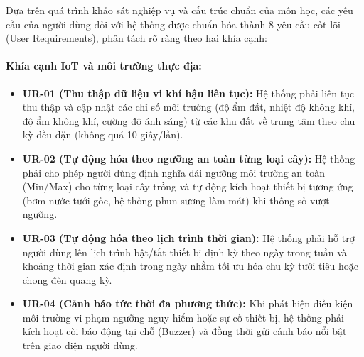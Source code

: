 Dựa trên quá trình khảo sát nghiệp vụ và cấu trúc chuẩn của môn học, các yêu cầu của người dùng đối với hệ thống được chuẩn hóa thành 8 yêu cầu cốt lõi (User Requirements), phân tách rõ ràng theo hai khía cạnh:

\paragraph{Khía cạnh IoT và môi trường thực địa:}
\begin{itemize}
    \item \textbf{UR-01 (Thu thập dữ liệu vi khí hậu liên tục):} Hệ thống phải liên tục thu thập và cập nhật các chỉ số môi trường (độ ẩm đất, nhiệt độ không khí, độ ẩm không khí, cường độ ánh sáng) từ các khu đất về trung tâm theo chu kỳ đều đặn (không quá 10 giây/lần).
    \item \textbf{UR-02 (Tự động hóa theo ngưỡng an toàn từng loại cây):} Hệ thống phải cho phép người dùng định nghĩa dải ngưỡng môi trường an toàn (Min/Max) cho từng loại cây trồng và tự động kích hoạt thiết bị tương ứng (bơm nước tưới gốc, hệ thống phun sương làm mát) khi thông số vượt ngưỡng.
    \item \textbf{UR-03 (Tự động hóa theo lịch trình thời gian):} Hệ thống phải hỗ trợ người dùng lên lịch trình bật/tắt thiết bị định kỳ theo ngày trong tuần và khoảng thời gian xác định trong ngày nhằm tối ưu hóa chu kỳ tưới tiêu hoặc chong đèn quang kỳ.
    \item \textbf{UR-04 (Cảnh báo tức thời đa phương thức):} Khi phát hiện điều kiện môi trường vi phạm ngưỡng nguy hiểm hoặc sự cố thiết bị, hệ thống phải kích hoạt còi báo động tại chỗ (Buzzer) và đồng thời gửi cảnh báo nổi bật trên giao diện người dùng.
\end{itemize}

